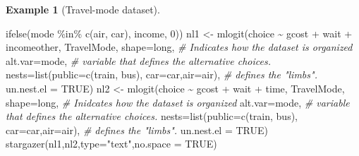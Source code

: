 \documentclass[
  12pt,
]{book}
\newenvironment{Shaded}{\begin{snugshade}}{\end{snugshade}}
\newcommand{\AttributeTok}[1]{\textcolor[rgb]{0.77,0.63,0.00}{#1}}
\newcommand{\CommentTok}[1]{\textcolor[rgb]{0.56,0.35,0.01}{\textit{#1}}}
\newcommand{\ConstantTok}[1]{\textcolor[rgb]{0.00,0.00,0.00}{#1}}
\newcommand{\DecValTok}[1]{\textcolor[rgb]{0.00,0.00,0.81}{#1}}
\newcommand{\FunctionTok}[1]{\textcolor[rgb]{0.00,0.00,0.00}{#1}}
\newcommand{\NormalTok}[1]{#1}
\newcommand{\OtherTok}[1]{\textcolor[rgb]{0.56,0.35,0.01}{#1}}
\newcommand{\SpecialCharTok}[1]{\textcolor[rgb]{0.00,0.00,0.00}{#1}}
\newcommand{\StringTok}[1]{\textcolor[rgb]{0.31,0.60,0.02}{#1}}
\theoremstyle{definition}
\theoremstyle{definition}
\newtheorem{example}{Example}[chapter]
\theoremstyle{definition}
\theoremstyle{definition}
\theoremstyle{remark}
\begin{document}
\begin{example}[Travel-mode dataset]
\begin{Shaded}
\begin{Highlighting}[]
                               \FunctionTok{ifelse}\NormalTok{(mode }\SpecialCharTok{\%in\%} \FunctionTok{c}\NormalTok{(}\StringTok{\textquotesingle{}air\textquotesingle{}}\NormalTok{, }\StringTok{\textquotesingle{}car\textquotesingle{}}\NormalTok{), income, }\DecValTok{0}\NormalTok{))}
\NormalTok{nl1 }\OtherTok{\textless{}{-}} \FunctionTok{mlogit}\NormalTok{(choice }\SpecialCharTok{\textasciitilde{}}\NormalTok{ gcost }\SpecialCharTok{+}\NormalTok{ wait }\SpecialCharTok{+}\NormalTok{ incomeother, TravelMode,}
              \AttributeTok{shape=}\StringTok{\textquotesingle{}long\textquotesingle{}}\NormalTok{, }\CommentTok{\# Indicates how the dataset is organized}
              \AttributeTok{alt.var=}\StringTok{\textquotesingle{}mode\textquotesingle{}}\NormalTok{, }\CommentTok{\# variable that defines the alternative choices.}
              \AttributeTok{nests=}\FunctionTok{list}\NormalTok{(}\AttributeTok{public=}\FunctionTok{c}\NormalTok{(}\StringTok{\textquotesingle{}train\textquotesingle{}}\NormalTok{, }\StringTok{\textquotesingle{}bus\textquotesingle{}}\NormalTok{),}
                         \AttributeTok{car=}\StringTok{\textquotesingle{}car\textquotesingle{}}\NormalTok{,}\AttributeTok{air=}\StringTok{\textquotesingle{}air\textquotesingle{}}\NormalTok{), }\CommentTok{\# defines the "limbs".}
              \AttributeTok{un.nest.el =} \ConstantTok{TRUE}\NormalTok{)}
\NormalTok{nl2 }\OtherTok{\textless{}{-}} \FunctionTok{mlogit}\NormalTok{(choice }\SpecialCharTok{\textasciitilde{}}\NormalTok{ gcost }\SpecialCharTok{+}\NormalTok{ wait }\SpecialCharTok{+}\NormalTok{ time, TravelMode,}
              \AttributeTok{shape=}\StringTok{\textquotesingle{}long\textquotesingle{}}\NormalTok{, }\CommentTok{\# Inidcates how the dataset is organized}
              \AttributeTok{alt.var=}\StringTok{\textquotesingle{}mode\textquotesingle{}}\NormalTok{, }\CommentTok{\# variable that defines the alternative choices.}
              \AttributeTok{nests=}\FunctionTok{list}\NormalTok{(}\AttributeTok{public=}\FunctionTok{c}\NormalTok{(}\StringTok{\textquotesingle{}train\textquotesingle{}}\NormalTok{, }\StringTok{\textquotesingle{}bus\textquotesingle{}}\NormalTok{),}
                         \AttributeTok{car=}\StringTok{\textquotesingle{}car\textquotesingle{}}\NormalTok{,}\AttributeTok{air=}\StringTok{\textquotesingle{}air\textquotesingle{}}\NormalTok{), }\CommentTok{\# defines the "limbs".}
              \AttributeTok{un.nest.el =} \ConstantTok{TRUE}\NormalTok{)}
\FunctionTok{stargazer}\NormalTok{(nl1,nl2,}\AttributeTok{type=}\StringTok{"text"}\NormalTok{,}\AttributeTok{no.space =} \ConstantTok{TRUE}\NormalTok{)}
\end{Highlighting}
\end{Shaded}


\end{example}
\end{document}

